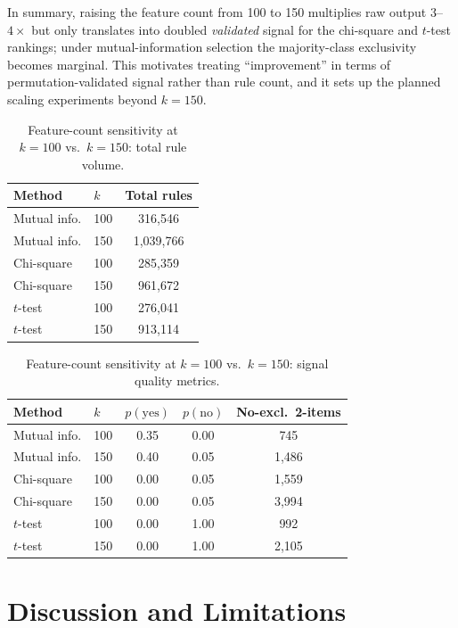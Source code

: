 \documentclass[twocolumn]{article}
\begin{document}
In summary, raising the feature count from 100 to 150 multiplies raw output
$3$--$4\times$ but only translates into doubled \emph{validated} signal for
the chi-square and $t$-test rankings; under mutual-information selection the
majority-class exclusivity becomes marginal. This motivates treating
``improvement'' in terms of permutation-validated signal rather than rule
count, and it sets up the planned scaling experiments beyond $k = 150$.

\begin{table}[h]
\centering
\small
\caption{Feature-count sensitivity at $k=100$ vs.\ $k=150$: total rule volume.}
\label{tab:sens-vol}
\begin{tabular}{llc}
\toprule
Method & $k$ & Total rules \\
\midrule
Mutual info. & 100 & 316{,}546 \\
Mutual info. & 150 & 1{,}039{,}766 \\
Chi-square & 100 & 285{,}359 \\
Chi-square & 150 & 961{,}672 \\
$t$-test & 100 & 276{,}041 \\
$t$-test & 150 & 913{,}114 \\
\bottomrule
\end{tabular}
\end{table}

\begin{table}[h]
\centering
\small
\caption{Feature-count sensitivity at $k=100$ vs.\ $k=150$: signal quality metrics.}
\label{tab:sens-sig}
\begin{tabular}{llccc}
\toprule
Method & $k$ & $p(\text{yes})$ & $p(\text{no})$ & No-excl.\ 2-items \\
\midrule
Mutual info. & 100 & 0.35 & 0.00 & 745 \\
Mutual info. & 150 & 0.40 & 0.05 & 1{,}486 \\
Chi-square & 100 & 0.00 & 0.05 & 1{,}559 \\
Chi-square & 150 & 0.00 & 0.05 & 3{,}994 \\
$t$-test & 100 & 0.00 & 1.00 & 992 \\
$t$-test & 150 & 0.00 & 1.00 & 2{,}105 \\
\bottomrule
\end{tabular}
\end{table}

\section{Discussion and Limitations}
\label{sec:limitations}
\end{document}
